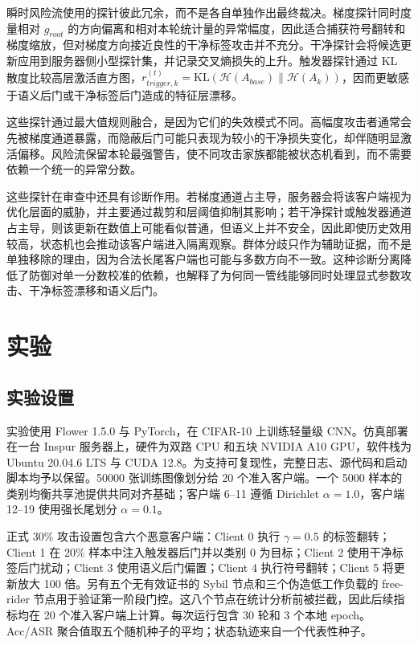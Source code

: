\documentclass[10pt,a4paper,UTF8,fontset=fandol]{ctexart}
\begin{document}
瞬时风险流使用的探针彼此冗余，而不是各自单独作出最终裁决。梯度探针同时度量相对 $g_{root}$ 的方向偏离和相对本轮统计量的异常幅度，因此适合捕获符号翻转和梯度缩放，但对梯度方向接近良性的干净标签攻击并不充分。干净探针会将候选更新应用到服务器侧小型探针集，并记录交叉熵损失的上升。触发器探针通过 KL 散度比较高层激活直方图，$r_{trigger,k}^{(t)}=\mathrm{KL}(\mathcal{H}(A_{base})\|\mathcal{H}(A_k))$，因而更敏感于语义后门或干净标签后门造成的特征层漂移。

这些探针通过最大值规则融合，是因为它们的失效模式不同。高幅度攻击者通常会先被梯度通道暴露，而隐蔽后门可能只表现为较小的干净损失变化，却伴随明显激活偏移。风险流保留本轮最强警告，使不同攻击家族都能被状态机看到，而不需要依赖一个统一的异常分数。

这些探针在审查中还具有诊断作用。若梯度通道占主导，服务器会将该客户端视为优化层面的威胁，并主要通过裁剪和层阈值抑制其影响；若干净探针或触发器通道占主导，则该更新在数值上可能看似普通，但语义上并不安全，因此即使历史效用较高，状态机也会推动该客户端进入隔离观察。群体分歧只作为辅助证据，而不是单独移除的理由，因为合法长尾客户端也可能与多数方向不一致。这种诊断分离降低了防御对单一分数校准的依赖，也解释了为何同一管线能够同时处理显式参数攻击、干净标签漂移和语义后门。

\section{实验}

\subsection{实验设置}

实验使用 Flower 1.5.0 与 PyTorch，在 CIFAR-10 上训练轻量级 CNN。仿真部署在一台 Inspur 服务器上，硬件为双路 CPU 和五块 NVIDIA A10 GPU，软件栈为 Ubuntu 20.04.6 LTS 与 CUDA 12.8。为支持可复现性，完整日志、源代码和启动脚本均予以保留。50000 张训练图像划分给 20 个准入客户端。一个 5000 样本的类别均衡共享池提供共同对齐基础；客户端 6--11 遵循 Dirichlet $\alpha=1.0$，客户端 12--19 使用强长尾划分 $\alpha=0.1$。

正式 30\% 攻击设置包含六个恶意客户端：Client 0 执行 $\gamma=0.5$ 的标签翻转；Client 1 在 20\% 样本中注入触发器后门并以类别 0 为目标；Client 2 使用干净标签后门扰动；Client 3 使用语义后门偏置；Client 4 执行符号翻转；Client 5 将更新放大 100 倍。另有五个无有效证书的 Sybil 节点和三个伪造低工作负载的 free-rider 节点用于验证第一阶段门控。这八个节点在统计分析前被拦截，因此后续指标均在 20 个准入客户端上计算。每次运行包含 30 轮和 3 个本地 epoch。Acc/ASR 聚合值取五个随机种子的平均；状态轨迹来自一个代表性种子。
\end{document}
